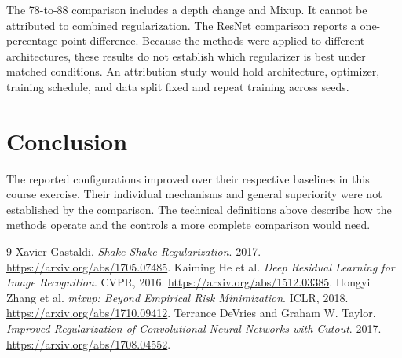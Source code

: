\documentclass[12pt]{article}
\begin{document}
The 78-to-88 comparison includes a depth change and Mixup. It cannot be
attributed to combined regularization. The ResNet comparison reports a
one-percentage-point difference. Because the methods were applied to different
architectures, these results do not establish which regularizer is best under
matched conditions. An attribution study would hold architecture, optimizer,
training schedule, and data split fixed and repeat training across seeds.

\section{Conclusion}
The reported configurations improved over their respective baselines in this
course exercise. Their individual mechanisms and general superiority were not
established by the comparison. The technical definitions above describe how the
methods operate and the controls a more complete comparison would need.

\begin{thebibliography}{9}
Xavier Gastaldi. \emph{Shake-Shake Regularization}.
2017. \url{https://arxiv.org/abs/1705.07485}.
Kaiming He et al. \emph{Deep Residual Learning for Image Recognition}.
CVPR, 2016. \url{https://arxiv.org/abs/1512.03385}.
Hongyi Zhang et al. \emph{mixup: Beyond Empirical Risk Minimization}.
ICLR, 2018. \url{https://arxiv.org/abs/1710.09412}.
Terrance DeVries and Graham W. Taylor.
\emph{Improved Regularization of Convolutional Neural Networks with Cutout}.
2017. \url{https://arxiv.org/abs/1708.04552}.
\end{thebibliography}
\end{document}

